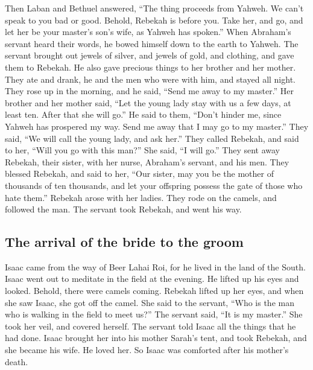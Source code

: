  Then Laban and Bethuel answered, ``The thing proceeds
from Yahweh. We can't speak to you bad or good.  Behold,
Rebekah is before you. Take her, and go, and let her be your master's
son's wife, as Yahweh has spoken.''  When Abraham's
servant heard their words, he bowed himself down to the earth to Yahweh.
 The servant brought out jewels of silver, and jewels of
gold, and clothing, and gave them to Rebekah. He also gave precious
things to her brother and her mother.  They ate and
drank, he and the men who were with him, and stayed all night. They rose
up in the morning, and he said, ``Send me away to my master.''
 Her brother and her mother said, ``Let the young lady
stay with us a few days, at least ten. After that she will go.''
 He said to them, ``Don't hinder me, since Yahweh has
prospered my way. Send me away that I may go to my master.''
 They said, ``We will call the young lady, and ask her.''
 They called Rebekah, and said to her, ``Will you go with
this man?'' She said, ``I will go.''  They sent away
Rebekah, their sister, with her nurse, Abraham's servant, and his men.
 They blessed Rebekah, and said to her, ``Our sister, may
you be the mother of thousands of ten thousands, and let your offspring
possess the gate of those who hate them.''  Rebekah arose
with her ladies. They rode on the camels, and followed the man. The
servant took Rebekah, and went his way.

\hypertarget{the-arrival-of-the-bride-to-the-groom}{%
\subsection{The arrival of the bride to the
groom}\label{the-arrival-of-the-bride-to-the-groom}}

 Isaac came from the way of Beer Lahai Roi, for he lived
in the land of the South.  Isaac went out to meditate in
the field at the evening. He lifted up his eyes and looked. Behold,
there were camels coming.  Rebekah lifted up her eyes,
and when she saw Isaac, she got off the camel.  She said
to the servant, ``Who is the man who is walking in the field to meet
us?'' The servant said, ``It is my master.'' She took her veil, and
covered herself.  The servant told Isaac all the things
that he had done.  Isaac brought her into his mother
Sarah's tent, and took Rebekah, and she became his wife. He loved her.
So Isaac was comforted after his mother's death.

